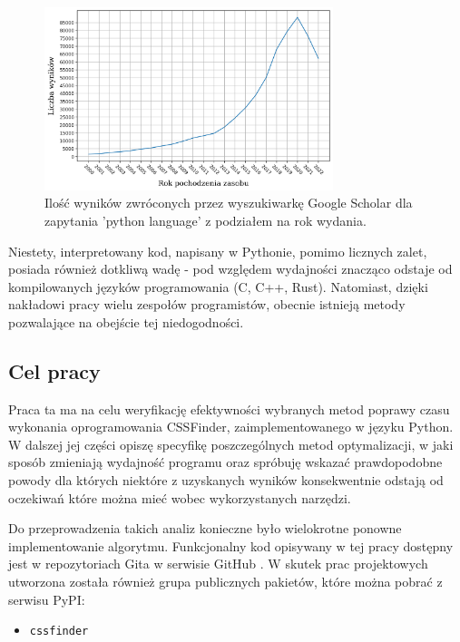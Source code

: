 \documentclass[12pt, a4paper]{article}
\newcommand{\code}[1]{\texttt{#1}}
\begin{document}
\begin{sloppypar}
    \FloatBarrier
    \begin{figure}[h]
      \centering
      \includegraphics[width=0.75\textwidth]{"images/python_language_results.png"}
      \caption{Ilość wyników zwróconych przez wyszukiwarkę Google Scholar dla zapytania 'python language' z podziałem na rok wydania.}
    \end{figure}
    \FloatBarrier

    Niestety, interpretowany kod, napisany w Pythonie, pomimo licznych zalet, posiada
    również dotkliwą wadę - pod względem wydajności znacząco odstaje od kompilowanych
    języków programowania (C\cite{C_vs_Python}, C++\cite{Cpp_vs_Python}, Rust\cite{Rust_vs_Python}).
    Natomiast, dzięki nakładowi pracy wielu zespołów programistów, obecnie istnieją
    metody pozwalające na obejście tej niedogodności.

    \subsection{Cel pracy}


    Praca ta ma na celu weryfikację efektywności wybranych metod poprawy czasu wykonania
    oprogramowania CSSFinder, zaimplementowanego w języku Python. W dalszej jej części
    opiszę specyfikę poszczególnych metod optymalizacji, w jaki sposób zmieniają wydajność
    programu oraz spróbuję wskazać prawdopodobne powody dla których niektóre z uzyskanych
    wyników konsekwentnie odstają od oczekiwań które można mieć wobec wykorzystanych narzędzi.

    Do przeprowadzenia takich analiz konieczne było wielokrotne ponowne implementowanie algorytmu.
    Funkcjonalny kod opisywany w tej pracy dostępny jest w repozytoriach Gita\cite{Git_Com}
    w serwisie GitHub \cite{CSSFinder_New}\cite{CSSFinder_New_Numpy}\cite{CSSFinder_New_Rust}.
    W skutek prac projektowych utworzona została również grupa publicznych pakietów, które
    można pobrać z serwisu PyPI:
    \begin{itemize}
      \item \code{cssfinder}\cite{CSSFinder_New_PyPI}


\end{itemize}
\end{sloppypar}
\end{document}
